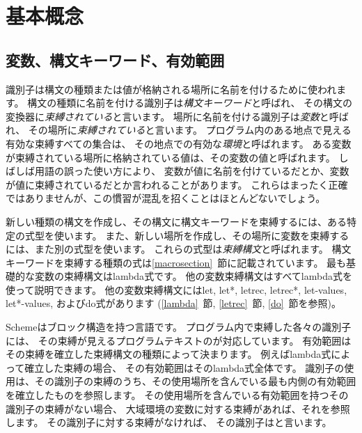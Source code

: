 \chapter{基本概念}
\label{basicchapter}

\section{変数、構文キーワード、有効範囲}
\label{specialformsection}
\label{variablesection}

識別子は構文の種類または値が格納される場所に名前を付けるために使われます。
構文の種類に名前を付ける識別子は{\em 構文キーワード}と呼ばれ、
その構文の変換器に{\em 束縛されている}と言います。
場所に名前を付ける識別子は{\em 変数}と呼ばれ、
その場所に{\em 束縛されている}と言います。
プログラム内のある地点で見える有効な束縛すべての集合は、
その地点での有効な{\em 環境}と呼ばれます。
ある変数が束縛されている場所に格納されている値は、その変数の値と呼ばれます。
しばしば用語の誤った使い方により、
変数が値に名前を付けているだとか、変数が値に束縛されているだとか言われることがあります。
これらはまったく正確ではありませんが、この慣習が混乱を招くことはほとんどないでしょう。

\vest 新しい種類の構文を作成し、その構文に構文キーワードを束縛するには、ある特定の式型を使います。
また、新しい場所を作成し、その場所に変数を束縛するには、また別の式型を使います。
これらの式型は{\em 束縛構文}と呼ばれます。
構文キーワードを束縛する種類の式は\ref{macrosection}~節に記載されています。
最も基礎的な変数の束縛構文は{\cf lambda}式です。
他の変数束縛構文はすべて{\cf lambda}式を使って説明できます。
他の変数束縛構文には{\cf let}, {\cf let*}, {\cf letrec},
{\cf letrec*}, {\cf let-values}, {\cf let*-values},
および{\cf do}式があります
(\ref{lambda}~節, \ref{letrec}~節, \ref{do}~節を参照)。


\vest Schemeはブロック構造を持つ言語です。
プログラム内で束縛した各々の識別子には、
その束縛が見えるプログラムテキストのが対応しています。
有効範囲はその束縛を確立した束縛構文の種類によって決まります。
例えば{\cf lambda}式によって確立した束縛の場合、
その有効範囲はその{\cf lambda}式全体です。
識別子の使用は、その識別子の束縛のうち、その使用場所を含んでいる最も内側の有効範囲を確立したものを参照します。
その使用場所を含んでいる有効範囲を持つその識別子の束縛がない場合、
大域環境の変数に対する束縛があれば、それを参照します。
その識別子に対する束縛がなければ、
その識別子はと言います。

